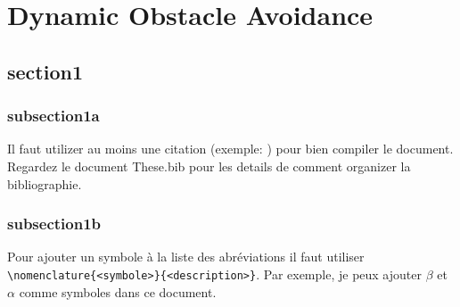 \documentclass[a4paper,11pt,twoside]{StyleThese}
\begin{document}
\setcounter{chapter}{0} %
\dominitoc
\faketableofcontents
\fi

\chapter{Dynamic Obstacle Avoidance}
\minitoc


\section{section1}
\subsection{subsection1a}
Il faut utilizer au moins une citation (exemple: \cite{goossens93}) pour bien
compiler le document. Regardez le document These.bib pour les details de
comment organizer la bibliographie.
\subsection{subsection1b}
Pour ajouter un symbole à la liste des abréviations il faut utiliser
\verb|\nomenclature{<symbole>}{<description>}|. Par exemple, je peux ajouter
$\beta$ et
$\alpha$ comme
symboles dans ce document.


\ifdefined{}
\else


\end{document}
